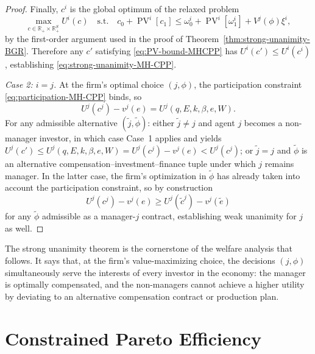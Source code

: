 \documentclass[11pt,a4paper,oneside]{book}
\def\R{\mathbb{R}}
\def\leq{\leqslant}
\def\geq{\geqslant}
\DeclareMathOperator{\PV}{PV}
\theoremstyle{plain}
\theoremstyle{definition}
\theoremstyle{remark}
\numberwithin{equation}{chapter}
\begin{document}
\begin{proof}
Finally, $c^i$ is the global optimum of the relaxed problem
\begin{equation*}
  \max_{c \in \R_+ \times \R_+^S} U^i(c) \quad \text{s.t.} \quad
  c_0 + \PV^i[c_1] \leq \omega^i_0 + \PV^i[\omega^i_1] + V^j(\phi) \xi^i,
\end{equation*}
by the first-order argument used in the proof of Theorem~\ref{thm:strong-unanimity-BGR}.
Therefore any $c'$ satisfying \eqref{eq:PV-bound-MHCPP} has $U^i(c') \leq U^i(c^i)$, establishing \eqref{eq:strong-unanimity-MH-CPP}.

\emph{Case 2: $i = j$.}
At the firm's optimal choice $(j, \phi)$, the participation constraint \eqref{eq:participation-MH-CPP} binds, so
\begin{equation*}
  U^j(c^j) - v^j(e) = U^j(q, E, k, \beta, e, W).
\end{equation*}
For any admissible alternative $(\widetilde{j}, \widetilde{\phi})$: either $\widetilde{j} \neq j$ and agent $j$ becomes a non-manager investor, in which case Case~1 applies and yields $U^j(c') \leq U^j(q, E, k, \beta, e, W) = U^j(c^j) - v^j(e) < U^j(c^j)$; or $\widetilde{j} = j$ and $\widetilde{\phi}$ is an alternative compensation--investment--finance tuple under which $j$ remains manager.
In the latter case, the firm's optimization in $\widetilde{\phi}$ has already taken into account the participation constraint, so by construction
\begin{equation*}
  U^j(c^j) - v^j(e) \geq U^j(\widetilde{c}^j) - v^j(\widetilde{e})
\end{equation*}
for any $\widetilde{\phi}$ admissible as a manager-$j$ contract, establishing weak unanimity for $j$ as well.
\end{proof}

The strong unanimity theorem is the cornerstone of the welfare analysis that follows.
It says that, at the firm's value-maximizing choice, the decisions $(j, \phi)$ simultaneously serve the interests of every investor in the economy: the manager is optimally compensated, and the non-managers cannot achieve a higher utility by deviating to an alternative compensation contract or production plan.

\section{Constrained Pareto Efficiency}
\label{sec:MH-CPP-welfare}
\end{document}
